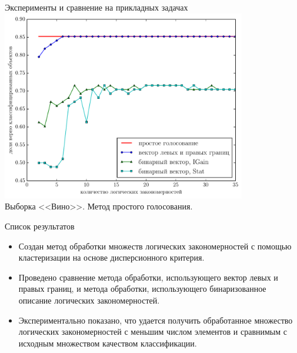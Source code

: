 \documentclass[utf8]{beamer}
\begin{document}
\begin{frame}{Эксперименты и сравнение на прикладных задачах}
  \centering
  \includegraphics[width=0.8\textwidth,keepaspectratio]{wine}
  \\ Выборка <<Вино>>. Метод простого голосования.
\end{frame}

\begin{frame}{Список результатов}
  \begin{itemize}
    \item Создан метод обработки множеств логических
      закономерностей с помощью кластеризации на основе дисперсионного
      критерия.
    \item Проведено сравнение метода обработки, использующего вектор
      левых и правых границ, и метода обработки, использующего
      бинаризованное описание логических закономерностей.
    \item Экспериментально показано, что удается получить обработанное
      множество логических закономерностей с меньшим числом элементов
      и сравнимым с исходным множеством качеством классификации.
  \end{itemize}
\end{frame}
\end{document}
